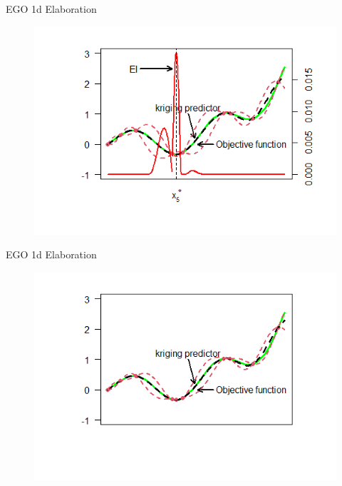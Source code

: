 \documentclass{beamer}
\begin{document}
\begin{frame}{EGO 1d Elaboration}
\begin{figure}
    \centering
    \includegraphics[scale=.7]{images/ego1d/fn9.png}
    \label{fig:f9}
\end{figure}
\end{frame}

\begin{frame}{EGO 1d Elaboration}
\begin{figure}
    \centering
    \includegraphics[scale=.7]{images/ego1d/fn10.png}
    \label{fig:f10}
\end{figure}
\end{frame}
\end{document}
